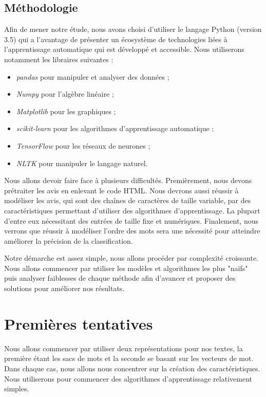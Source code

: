 \documentclass{article}
\begin{document}
\subsection{Méthodologie}

Afin de mener notre étude, nous avons choisi d'utiliser le langage Python (version 3.5) qui a l'avantage de présenter un écosystème de technologies liées à l'apprentissage automatique qui est développé et accessible. Nous utiliserons notamment les libraires suivantes :
\begin{itemize}
	\item \textit{pandas} pour manipuler et analyser des données ;
	\item \textit{Numpy} pour l'algèbre linéaire ; 
	\item \textit{Matplotlib} pour les graphiques ;
	\item \textit{scikit-learn} pour les algorithmes d'apprentissage automatique ;
	\item \textit{TensorFlow} pour les réseaux de neurones ;
	\item \textit{NLTK} pour manipuler le langage naturel.
\end{itemize}

Nous allons devoir faire face à plusieurs difficultés. Premièrement, nous devons prétraiter les avis en enlevant le code HTML. Nous devrons aussi réussir à modéliser les avis, qui sont des chaînes de caractères de taille variable, par des caractéristiques permettant d'utiliser des algorithmes d'apprentissage. La plupart d'entre eux nécessitant des entrées de taille fixe et numériques. Finalement, nous verrons que réussir à modéliser l'ordre des mots sera une nécessité pour atteindre améliorer la précision de la classification.

Notre démarche est assez simple, nous allons procéder par complexité croissante. Nous allons commencer par utiliser les modèles et algorithmes les plus "naïfs" puis analyser faiblesses de chaque  méthode afin d'avancer et proposer des solutions pour améliorer nos résultats.

\section{Premières tentatives}

Nous allons commencer par utiliser deux représentations pour nos textes, la première étant les sacs de mots et la seconde se basant sur les vecteurs de mot. Dans chaque cas, nous allons nous concentrer sur la création des caractéristiques. Nous utiliserons pour commencer des algorithmes d'apprentissage relativement simples.
\end{document}
